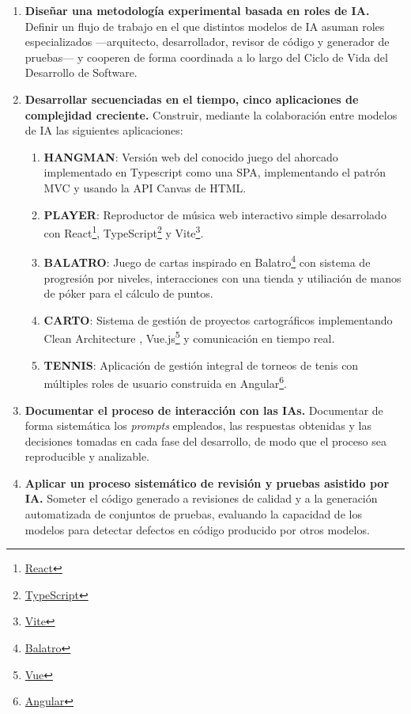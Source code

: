 \begin{enumerate}
  \item \textbf{Diseñar una metodología experimental basada en roles de IA.} Definir un flujo de trabajo en el que distintos modelos de \ac{IA} asuman roles especializados ---arquitecto, desarrollador, revisor de código y generador de pruebas--- y cooperen de forma coordinada a lo largo del
  Ciclo de Vida del Desarrollo de Software.

  \item \textbf{Desarrollar secuenciadas en el tiempo, cinco aplicaciones de complejidad creciente.} Construir, mediante la colaboración entre modelos de \ac{IA} las siguientes aplicaciones:
  \begin{enumerate}
    \item \textbf{\ac{HANGMAN}}: Versión web del conocido juego del ahorcado implementado en Typescript como una \ac{SPA}, implementando el patrón \ac{MVC}  \cite{Reenskaug:1979:MVC} y usando la API Canvas de HTML.
    \item \textbf{\ac{PLAYER}}: Reproductor de música web interactivo simple desarrolado con React\footnote{\href{https://es.react.dev}{React}}, TypeScript\footnote{\href{https://www.typescriptlang.org}{TypeScript}} y Vite\footnote{\href{https://es.vite.dev}{Vite}}. 
    \item \textbf{\ac{BALATRO}}: Juego de cartas inspirado en Balatro\footnote{\href{https://es.wikipedia.org/wiki/Balatro}{Balatro}} con sistema de progresión por niveles, interacciones con una tienda y utiliación de manos de póker para el cálculo de puntos.
    \item \textbf{\ac{CARTO}}: Sistema de gestión de proyectos cartográficos implementando Clean Architecture \cite{Martin:2018:CleanArchitecture}, Vue.js\footnote{\href{https://vuejs.org}{Vue}} y comunicación en tiempo real.
    \item \textbf{\ac{TENNIS}}: Aplicación de gestión integral de torneos de tenis con múltiples roles de usuario construida en Angular\footnote{\href{https://angular.dev}{Angular}}.
  \end{enumerate}

  \item \textbf{Documentar el proceso de interacción con las IAs.} Documentar de forma sistemática los \textit{prompts} empleados, las respuestas obtenidas y las decisiones tomadas en cada fase del desarrollo, de modo que el proceso sea reproducible y analizable.

  \item \textbf{Aplicar un proceso sistemático de revisión y pruebas asistido por IA.} Someter el código generado a revisiones de calidad y a la generación automatizada de conjuntos de pruebas, evaluando la capacidad de los modelos para detectar defectos en código producido por otros modelos.


\end{enumerate}
